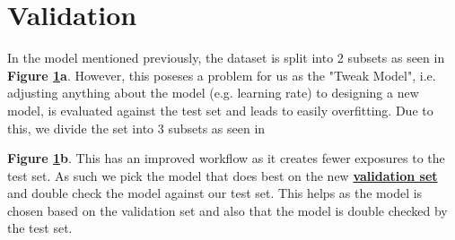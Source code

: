 \documentclass[12pt]{article}
\begin{document}
\section{Validation}
In the model mentioned previously, the dataset is split into 2 subsets as seen in \textbf{Figure \ref{fig: importance of validation sets}a}. However, this poseses a problem for us as the "Tweak Model", i.e. adjusting anything about the model (e.g. learning rate) to designing a new model, is evaluated against the test set and leads to easily overfitting. Due to this, we divide the set into 3 subsets as seen in 
\begin{figure}[h!]%
    \centering
    \qquad
    \caption{}%
	\label{fig: importance of validation sets}
\end{figure}
\textbf{Figure \ref{fig: importance of validation sets}b}. This has an improved workflow as it creates fewer exposures to the test set. As such we pick the model that does best on the new \href{https://developers.google.com/machine-learning/glossary#validation_set}{\textbf{validation set}} and double check the model against our test set.
This helps as the model is chosen based on the validation set and also that the model is double checked by the test set.
\end{document}
